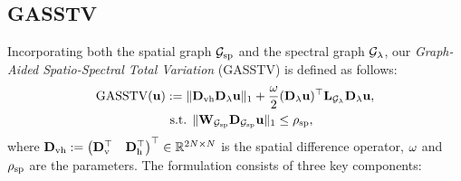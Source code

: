 


\subsection{GASSTV}
\label{subsec:GASSTV}
Incorporating both the spatial graph $\mathcal{G}_{\text{sp}}$ and the spectral graph $\mathcal{G}_{\lambda}$, our \textit{Graph-Aided Spatio-Spectral Total Variation} (GASSTV) is defined as follows:
\begin{align}
    \label{eq:GASSTV}
    \text{GASSTV}(\mathbf{u}) &:= \| \mathbf{D}_{\text{vh}} \mathbf{D}_{\lambda} \mathbf{u}\|_{1} + \frac{\omega}{2} (\mathbf{D}_{\lambda} \mathbf{u})^{\top} \mathbf{L}_{\mathcal{G}_{\lambda}} \mathbf{D}_{\lambda} \mathbf{u}, \notag \\
    &\text{ s.t. } \| \mathbf{W}_{\mathcal{G}_{\text{sp}}} \mathbf{D}_{\mathcal{G}_{\text{sp}}} \mathbf{u} \|_{1} \leq \rho_{\text{sp}},
\end{align}
where $\mathbf{D}_{\text{vh}} := \begin{pmatrix} \mathbf{D}_{\text{v}}^{\top} & \mathbf{D}_{\text{h}}^{\top} \end{pmatrix}^{\top} \in \mathbb{R}^{2 N \times N}$ is the spatial difference operator, $\omega$ and $\rho_{\text{sp}}$ are the parameters.
 The formulation consists of three key components:
